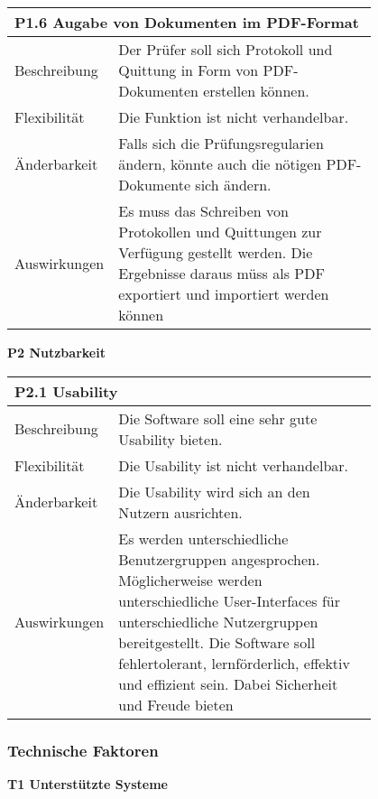 {%
\centering
\begin{tabular}{|l|p{0.8\linewidth}|}
\hline
\multicolumn{2}{|l|}{\textbf{P1.6 Augabe von Dokumenten im PDF-Format}}
  \tabularnewline \hline
Beschreibung                                               &  Der Prüfer soll sich Protokoll und Quittung in Form von PDF-Dokumenten erstellen können. \tabularnewline \hline
Flexibilität                                              & Die Funktion ist nicht verhandelbar. \tabularnewline \hline
Änderbarkeit                                         & Falls sich die Prüfungsregularien ändern, könnte auch die nötigen PDF-Dokumente sich ändern.                                                               \tabularnewline \hline
Auswirkungen                                                & Es muss das Schreiben von Protokollen und Quittungen zur Verfügung gestellt werden. Die Ergebnisse daraus müss als PDF exportiert und importiert werden können \tabularnewline \hline
 \hline
\end{tabular}

\raggedright
\textbf{P2 Nutzbarkeit}

\centering
\begin{tabular}{|l|p{0.8\linewidth}|}
\hline
\multicolumn{2}{|l|}{\textbf{P2.1 Usability}}
  \tabularnewline \hline
Beschreibung                                               &  Die Software soll eine sehr gute Usability bieten. \tabularnewline \hline
Flexibilität                                              & Die Usability ist nicht verhandelbar.                                                                                \tabularnewline \hline
Änderbarkeit                                         & Die Usability wird sich an den Nutzern ausrichten.                                                                 \tabularnewline \hline
Auswirkungen                                                & Es werden unterschiedliche Benutzergruppen angesprochen. Möglicherweise werden unterschiedliche User-Interfaces für unterschiedliche Nutzergruppen bereitgestellt. Die Software soll fehlertolerant, lernförderlich, effektiv und effizient sein. Dabei Sicherheit und Freude bieten \tabularnewline \hline
 \hline
\end{tabular}


\subsubsection{Technische Faktoren}
\raggedright
\textbf{T1 Unterstützte Systeme}

}
